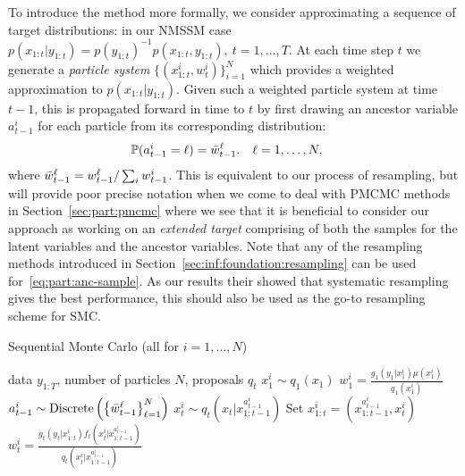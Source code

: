 To introduce the \smc method more formally, we consider approximating a sequence of target distributions: in our NMSSM
 case $p(x_{1:t}|y_{1:t}) = p(y_{1:t})^{-1} p(x_{1:t},y_{1:t}), ~t=1,\ldots,T$. 
At each time step $t$ we 
generate a \emph{particle system}
$\{(x_{1:t}^i,w_{t}^i)\}_{i=1}^N$ which provides a weighted approximation  to $p(x_{1:t}|y_{1:t})$. Given such a weighted particle system at time $t-1$, this 
is propagated forward in time to $t$ by first drawing an ancestor variable $a_{t-1}^i$ for each particle from its corresponding distribution:
\begin{align}
\label{eq:part:anc-sample}
\mathbb{P}(a_{t-1}^i = \ell) &= \bar w_{t-1}^\ell.
&
\ell&=1,\ldots,N,
\end{align}
where $\bar w_{t-1}^\ell = w_{t-1}^\ell / \sum_i w_{t-1}^i$. This is equivalent to our process of resampling, but
will provide poor precise notation when we come to deal with PMCMC methods in Section~\ref{sec:part:pmcmc}
where we see that it is beneficial to consider our approach as working on an \emph{extended target} comprising
of both the samples for the latent variables and the ancestor variables.  Note that any of the resampling 
methods introduced in Section~\ref{sec:inf:foundation:resampling} can be used for~\eqref{eq:part:anc-sample}.  As
our results their showed that systematic resampling gives the best performance, this should also be used
as the go-to resampling scheme for SMC.

\begin{algorithm}[tb]
	\caption{Sequential Monte Carlo \hfill {\small (all for $i=1,\ldots,N$)}}
	\label{alg:part:smc}
	\begin{spacing}{1.2}
		\begin{algorithmic}[1]
			\renewcommand{\algorithmicrequire}{\textbf{Inputs:}}
			\renewcommand{\algorithmicensure}{\textbf{Outputs:}}				 
			\Require  data $y_{1:T}$, number of particles $N$, proposals $q_t$
			\State $x_1^i \sim q_1(x_1)$
			\State $w_1^i = \frac{g_1(y_1|x_1^i) \mu(x_1^i)}{q_1(x_1^i)}$
			\State $a_{t-1}^i \sim \operatorname*{Discrete}\left(\left\{\bar w_{t-1}^{\ell}\right\}_{\ell=1}^N\right)$%
			\State $x_t^i \sim q_t(x_t | x_{1:t-1}^{a_{t-1}^i})$ 
			\State Set $x_{1:t}^i = (x_{1:t-1}^{a_{t-1}^i},x_t^i)$
			\State $w_t^i = \frac{g_t(y_t|x_{1:t}^i) f_t(x_t^i | x_{1:t-1}^{a_{t-1}^i})}{q_t(x_t^i|x_{1:t-1}^{a_{t-1}^i})}$
			\EndFor
		\end{algorithmic}
	\end{spacing}
\end{algorithm}

